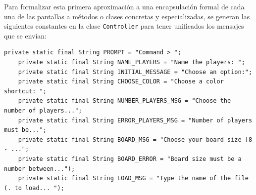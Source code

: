 \documentclass[../DocumentoOficial.tex]{subfiles}
\begin{document}
Para formalizar esta primera aproximación a una encapsulación formal de cada una de las pantallas a métodos o clases concretas y especializadas, se generan las siguientes constantes en la clase \texttt{Controller} para tener unificados los mensajes que se envían:
\begin{lstlisting}
private static final String PROMPT = "Command > ";
	private static final String NAME_PLAYERS = "Name the players: ";
	private static final String INITIAL_MESSAGE = "Choose an option:";
	private static final String CHOOSE_COLOR = "Choose a color shortcut: ";
	private static final String NUMBER_PLAYERS_MSG = "Choose the number of players...";
	private static final String ERROR_PLAYERS_MSG = "Number of players must be...";
	private static final String BOARD_MSG = "Choose your board size [8 - ...";
	private static final String BOARD_ERROR = "Board size must be a number between...");
	private static final String LOAD_MSG = "Type the name of the file (. to load... ");
\end{lstlisting}
\end{document}
